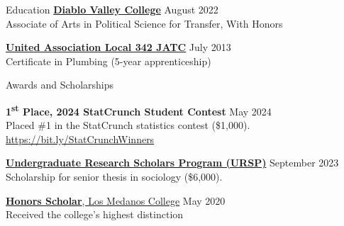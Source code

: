 \documentclass[
	12pt, %
]{resume} %
\begin{document}
\begin{samepage}
\begin{rSection}{Education}
\textbf{\href{https://www.dvc.edu/}{Diablo Valley College}} \hfill August 2022\\ 
\hspace*{20pt}Associate of Arts in Political Science for Transfer, With Honors

\href{https://ua342.org/training}{\textbf{United Association Local 342 JATC}} \hfill July 2013\\
\hspace*{20pt}Certificate in Plumbing (5-year apprenticeship)

\end{rSection}
\end{samepage}

\begin{samepage}
\begin{rSection}{Awards and Scholarships}

\textbf{1\textsuperscript{st} Place, 2024 StatCrunch Student Contest} \hfill May 2024\\
\hspace*{20pt}Placed \#1 in the StatCrunch statistics contest (\$\thinspace{}1,000).\\
\hspace*{20pt}\href{https://bit.ly/StatCrunchWinners}{https://bit.ly/StatCrunchWinners}

\href{https://hass.ugresearch.ucla.edu/scholarships/ursp/students/}{\textbf{Undergraduate Research Scholars Program (URSP)}} \hfill September 2023 \\
\hspace*{20pt}Scholarship for senior thesis in sociology (\$\thinspace{}6,000).

\href{https://www.losmedanos.edu/honors/prog.aspx\#:~:text=Honors\%20Scholar\%20Requirements}{\textbf{Honors Scholar}, Los Medanos College} \hfill May 2020 \\
\hspace*{20pt}Received the college’s highest distinction
\end{rSection}
\end{samepage}
\end{document}
